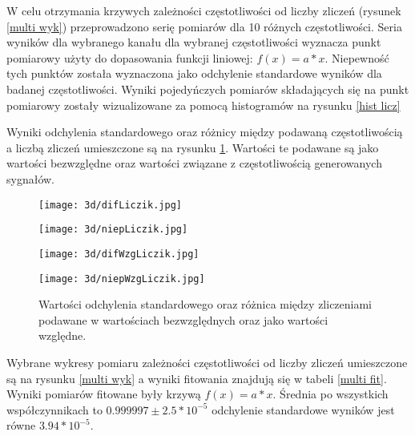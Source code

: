W celu otrzymania krzywych zależności częstotliwości od liczby zliczeń (rysunek \ref{multi wyk}) przeprowadzono serię pomiarów dla 10 różnych częstotliwości. Seria wyników dla wybranego kanału dla wybranej częstotliwości wyznacza punkt pomiarowy użyty do dopasowania funkcji liniowej: $f(x) = a * x$. Niepewność tych punktów została wyznaczona jako odchylenie standardowe wyników dla badanej częstotliwości. Wyniki pojedyńczych pomiarów składających się na punkt pomiarowy zostały wizualizowane za pomocą histogramów na rysunku \ref{hist licz}

Wyniki odchylenia standardowego oraz różnicy między podawaną częstotliwością a liczbą zliczeń umieszczone są na rysunku \ref{3d licznik}. Wartości te podawane są jako wartości bezwzględne oraz wartości związane z częstotliwością generowanych sygnałów.

\begin{figure}
        \centering
        \begin{multicols}{2}
                \texttt{[image: 3d/difLiczik.jpg]} \par                
                \texttt{[image: 3d/niepLiczik.jpg]} \par                
        \end{multicols} \hfill
        \begin{multicols}{2}
                \texttt{[image: 3d/difWzgLiczik.jpg]} \par                
                \texttt{[image: 3d/niepWzgLiczik.jpg]} \par                
        \end{multicols}
        \caption{Wartości odchylenia standardowego oraz różnica między zliczeniami podawane w wartościach bezwzględnych oraz jako wartości względne. }
        \label{3d licznik}
\end{figure}

Wybrane wykresy pomiaru zależności częstotliwości od liczby zliczeń umieszczone są na rysunku \ref{multi wyk} a wyniki fitowania znajdują się w tabeli \ref{multi fit}. Wyniki pomiarów fitowane były krzywą $f(x) = a*x$. 
Średnia po wszystkich współczynnikach to $0.999997 \pm 2.5*10^{-5}$
odchylenie standardowe wyników jest równe  $3.94 * 10^{-5}$.

